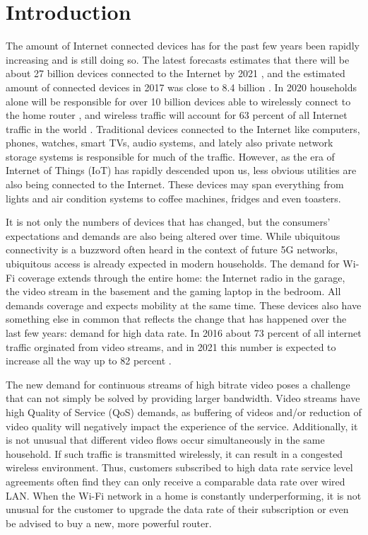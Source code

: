 \chapter{Introduction}
The amount of Internet connected devices has for the past few years been rapidly increasing and is still doing so. The latest forecasts
estimates that there will be about 27 billion devices connected to the Internet by 2021 \cite{CiscoVNI2017}, and the estimated amount of 
connected devices in 2017 was close to 8.4 billion \cite{Gartner}. In 2020 households alone will be responsible for over 10 billion devices
able to wirelessly connect to the home router \cite{wifialliance}, and wireless traffic will account for 63 percent of all Internet traffic in the world \cite{CiscoVNI2017}. 
Traditional devices connected to the Internet like computers, phones, watches, smart TVs, audio systems, and lately also private network storage systems is responsible
for much of the traffic. However, as the era of Internet of Things (IoT) has rapidly descended upon us, less obvious utilities are also being connected to the Internet.
These devices may span everything from lights and air condition systems to coffee machines, fridges and even toasters.

It is not only the numbers of devices that has changed, but the consumers' expectations and demands are also being altered over time. 
While ubiquitous connectivity is a buzzword often heard in the context of future 5G networks, ubiquitous access is already expected in
modern households. The demand for Wi-Fi coverage extends through the entire home: the Internet radio in the garage, the video stream in the basement and the gaming laptop in the bedroom. All demands coverage and expects mobility at the same time. These devices also have something else in
common that reflects the change that has happened over the last few years: demand for high data rate. In 2016 about 73 percent of all internet traffic orginated from video
streams, and in 2021 this number is expected to increase all the way up to 82 percent \cite{CiscoVNI2017}. 


The new demand for continuous streams of high bitrate video poses a challenge that can not simply be solved by providing larger bandwidth. Video streams
have high Quality of Service (QoS) demands, as buffering of videos and/or reduction of video quality will negatively impact the experience of the service.
Additionally, it is not unusual that different video flows occur simultaneously in the same household. If such traffic is transmitted wirelessly,
it can result in a congested wireless environment. Thus, customers subscribed to high data rate service level agreements often find they can only receive a comparable data rate over wired LAN.
When the Wi-Fi network in a home is constantly underperforming, it is not unusual for the customer to upgrade the data rate of their subscription or even be advised to buy a new, more powerful router. 

